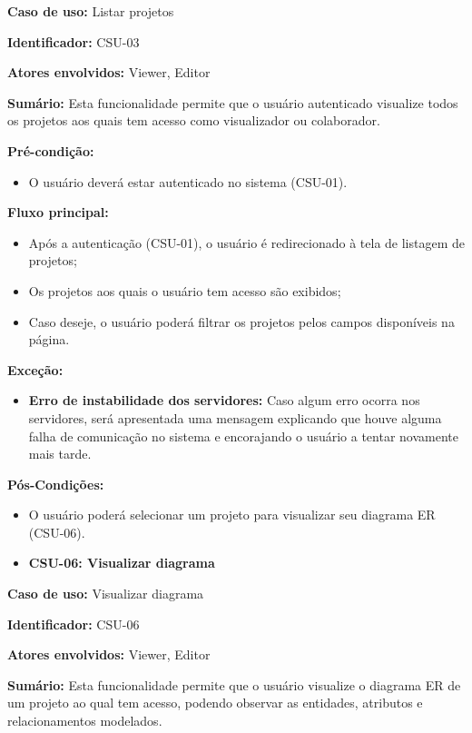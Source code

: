 \textbf{Caso de uso:} Listar projetos

\textbf{Identificador:} CSU-03

\textbf{Atores envolvidos:} Viewer, Editor

\textbf{Sumário:} Esta funcionalidade permite que o usuário autenticado visualize todos os projetos aos quais tem acesso como visualizador ou colaborador.

\textbf{Pré-condição:}
\begin{itemize}
    \item O usuário deverá estar autenticado no sistema (CSU-01).
\end{itemize}

\textbf{Fluxo principal:}
\begin{itemize}
    \item Após a autenticação (CSU-01), o usuário é redirecionado à tela de listagem de projetos;
    \item Os projetos aos quais o usuário tem acesso são exibidos;
    \item Caso deseje, o usuário poderá filtrar os projetos pelos campos disponíveis na página.
\end{itemize}

\textbf{Exceção:}
\begin{itemize}
    \item \textbf{Erro de instabilidade dos servidores:} Caso algum erro ocorra nos servidores, será apresentada uma mensagem explicando que houve alguma falha de comunicação no sistema e encorajando o usuário a tentar novamente mais tarde.
\end{itemize}

\textbf{Pós-Condições:}
\begin{itemize}
    \item O usuário poderá selecionar um projeto para visualizar seu diagrama ER (CSU-06).
\end{itemize}

\vspace{1em}

\begin{itemize}
    \item \textbf{CSU-06: Visualizar diagrama}
\end{itemize}

\textbf{Caso de uso:} Visualizar diagrama

\textbf{Identificador:} CSU-06

\textbf{Atores envolvidos:} Viewer, Editor

\textbf{Sumário:} Esta funcionalidade permite que o usuário visualize o diagrama ER de um projeto ao qual tem acesso, podendo observar as entidades, atributos e relacionamentos modelados.

